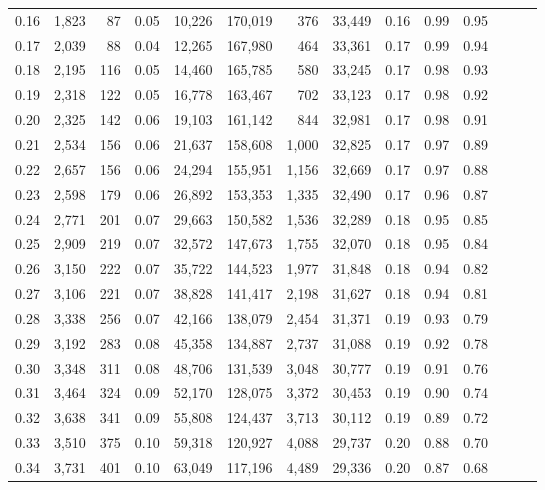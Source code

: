 \begin{tabular}{rrrrrrrrrrrrrr}
0.16 &  1,823 &   87 &  0.05 &   10,226 &  170,019 &     376 &  33,449 &  0.16 &  0.99 &      0.95 \\
0.17 &  2,039 &   88 &  0.04 &   12,265 &  167,980 &     464 &  33,361 &  0.17 &  0.99 &      0.94 \\
0.18 &  2,195 &  116 &  0.05 &   14,460 &  165,785 &     580 &  33,245 &  0.17 &  0.98 &      0.93 \\
0.19 &  2,318 &  122 &  0.05 &   16,778 &  163,467 &     702 &  33,123 &  0.17 &  0.98 &      0.92 \\
0.20 &  2,325 &  142 &  0.06 &   19,103 &  161,142 &     844 &  32,981 &  0.17 &  0.98 &      0.91 \\
0.21 &  2,534 &  156 &  0.06 &   21,637 &  158,608 &   1,000 &  32,825 &  0.17 &  0.97 &      0.89 \\
0.22 &  2,657 &  156 &  0.06 &   24,294 &  155,951 &   1,156 &  32,669 &  0.17 &  0.97 &      0.88 \\
0.23 &  2,598 &  179 &  0.06 &   26,892 &  153,353 &   1,335 &  32,490 &  0.17 &  0.96 &      0.87 \\
0.24 &  2,771 &  201 &  0.07 &   29,663 &  150,582 &   1,536 &  32,289 &  0.18 &  0.95 &      0.85 \\
0.25 &  2,909 &  219 &  0.07 &   32,572 &  147,673 &   1,755 &  32,070 &  0.18 &  0.95 &      0.84 \\
0.26 &  3,150 &  222 &  0.07 &   35,722 &  144,523 &   1,977 &  31,848 &  0.18 &  0.94 &      0.82 \\
0.27 &  3,106 &  221 &  0.07 &   38,828 &  141,417 &   2,198 &  31,627 &  0.18 &  0.94 &      0.81 \\
0.28 &  3,338 &  256 &  0.07 &   42,166 &  138,079 &   2,454 &  31,371 &  0.19 &  0.93 &      0.79 \\
0.29 &  3,192 &  283 &  0.08 &   45,358 &  134,887 &   2,737 &  31,088 &  0.19 &  0.92 &      0.78 \\
0.30 &  3,348 &  311 &  0.08 &   48,706 &  131,539 &   3,048 &  30,777 &  0.19 &  0.91 &      0.76 \\
0.31 &  3,464 &  324 &  0.09 &   52,170 &  128,075 &   3,372 &  30,453 &  0.19 &  0.90 &      0.74 \\
0.32 &  3,638 &  341 &  0.09 &   55,808 &  124,437 &   3,713 &  30,112 &  0.19 &  0.89 &      0.72 \\
0.33 &  3,510 &  375 &  0.10 &   59,318 &  120,927 &   4,088 &  29,737 &  0.20 &  0.88 &      0.70 \\
0.34 &  3,731 &  401 &  0.10 &   63,049 &  117,196 &   4,489 &  29,336 &  0.20 &  0.87 &      0.68 \\

\end{tabular}
